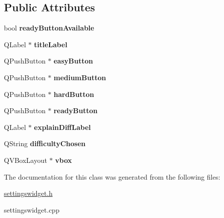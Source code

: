 \subsection*{Public Attributes}
\begin{DoxyCompactItemize}
\item 
\mbox{\label{classSettingsWidget_ae230be0cf35e7b7dafda138cfff40a6f}} 
bool {\bfseries ready\+Button\+Available}
\item 
\mbox{\label{classSettingsWidget_a22e199038772e7324eea3b43062f75b5}} 
Q\+Label $\ast$ {\bfseries title\+Label}
\item 
\mbox{\label{classSettingsWidget_a2b4015107c511f83d1eb180d61fdc967}} 
Q\+Push\+Button $\ast$ {\bfseries easy\+Button}
\item 
\mbox{\label{classSettingsWidget_a93fc5e9365a8a3f2a4ebc014585d0307}} 
Q\+Push\+Button $\ast$ {\bfseries medium\+Button}
\item 
\mbox{\label{classSettingsWidget_a6fde713cda8c16edf7842577bd716246}} 
Q\+Push\+Button $\ast$ {\bfseries hard\+Button}
\item 
\mbox{\label{classSettingsWidget_a71560e6adfd8309ef14e7b348f48ecca}} 
Q\+Push\+Button $\ast$ {\bfseries ready\+Button}
\item 
\mbox{\label{classSettingsWidget_aa6a7618c40fdf60417fe356319a012dd}} 
Q\+Label $\ast$ {\bfseries explain\+Diff\+Label}
\item 
\mbox{\label{classSettingsWidget_a7d9dc29c16fd99cb20a2f7ac44ec56ad}} 
Q\+String {\bfseries difficulty\+Chosen}
\item 
\mbox{\label{classSettingsWidget_ae61202ba2dc23fe3708de9636accb807}} 
Q\+V\+Box\+Layout $\ast$ {\bfseries vbox}
\end{DoxyCompactItemize}


The documentation for this class was generated from the following files\+:\begin{DoxyCompactItemize}
\item 
\hyperlink{settingswidget_8h}{settingswidget.\+h}\item 
settingswidget.\+cpp\end{DoxyCompactItemize}
